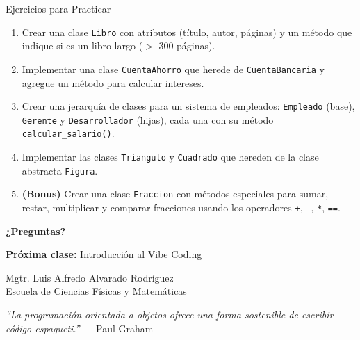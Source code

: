\documentclass[aspectratio=169]{beamer}
\begin{document}
\begin{frame}{Ejercicios para Practicar}
    \begin{enumerate}
        \setlength\itemsep{0.7em}
        \item Crear una clase \texttt{Libro} con atributos (título, autor, páginas) y un método que indique si es un libro largo ($>$ 300 páginas).
        
        \item Implementar una clase \texttt{CuentaAhorro} que herede de \texttt{CuentaBancaria} y agregue un método para calcular intereses.
        
        \item Crear una jerarquía de clases para un sistema de empleados: \texttt{Empleado} (base), \texttt{Gerente} y \texttt{Desarrollador} (hijas), cada una con su método \texttt{calcular\_salario()}.
        
        \item Implementar las clases \texttt{Triangulo} y \texttt{Cuadrado} que hereden de la clase abstracta \texttt{Figura}.
        
        \item \textbf{(Bonus)} Crear una clase \texttt{Fraccion} con métodos especiales para sumar, restar, multiplicar y comparar fracciones usando los operadores \texttt{+}, \texttt{-}, \texttt{*}, \texttt{==}.
    \end{enumerate}
\end{frame}

\begin{frame}
    \centering
    \Huge \textbf{¿Preguntas?}
    
    \vspace{0.8cm}
    \large
    \textbf{Próxima clase:} Introducción al Vibe Coding
    
    \vspace{0.5cm}
    \normalsize
    Mgtr. Luis Alfredo Alvarado Rodríguez\\
    \small Escuela de Ciencias Físicas y Matemáticas
    
    \vspace{0.5cm}
    \footnotesize
    \textit{``La programación orientada a objetos ofrece una forma sostenible de escribir código espagueti.''} — Paul Graham
\end{frame}
\end{document}
